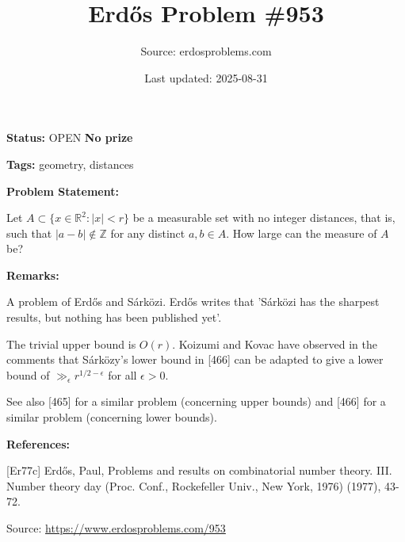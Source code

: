 \documentclass{article}
\title{Erd\H{o}s Problem \#953}
\date{Last updated: 2025-08-31}
\author{Source: erdosproblems.com}
\begin{document}
\maketitle

\noindent\textbf{Status:} OPEN \quad \textbf{No prize}

\noindent\textbf{Tags:} geometry, distances

\medskip
\noindent\textbf{Problem Statement:}

Let $A\subset \{ x\in \mathbb{R}^2 : \lvert x\rvert <r\}$ be a measurable set with no integer distances, that is, such that $\lvert a-b\rvert \not\in \mathbb{Z}$ for any distinct $a,b\in A$. How large can the measure of $A$ be?

\bigskip
\noindent\textbf{Remarks:}

A problem of Erd\H{o}s and S\'{a}rk\"{o}zi. Erd\H{o}s \cite{Er77c} writes that 'S\'{a}rk\"{o}zi has the sharpest results, but nothing has been published yet'.

The trivial upper bound is $O(r)$. Koizumi and Kovac have observed in the comments that S\'{a}rk\"{o}zy's lower bound in [466] can be adapted to give a lower bound of $\gg_\epsilon r^{1/2-\epsilon}$ for all $\epsilon>0$.

See also [465] for a similar problem (concerning upper bounds) and [466] for a similar problem (concerning lower bounds).

\bigskip
\noindent\textbf{References:}

[Er77c] Erd\H{o}s, Paul, Problems and results on combinatorial number theory. III. Number theory day (Proc. Conf., Rockefeller Univ.,
New York, 1976) (1977), 43-72.

\bigskip
\noindent\small{Source: \url{https://www.erdosproblems.com/953}}
\end{document}
